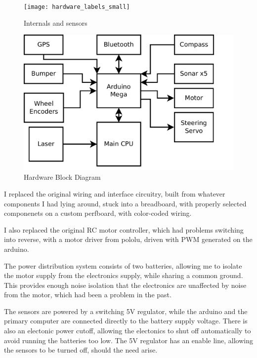 
\begin{figure}[!h]
\texttt{[image: hardware\_labels\_small]}
\caption{Internals and sensors}
\end{figure}

\begin{figure}
\includegraphics[width=1.0\textwidth]{block_diagram}
\caption{Hardware Block Diagram}
\end{figure}

I replaced the original wiring and interface circuitry, built from whatever components I had lying around, stuck into a breadboard, with properly selected componenets on a custom perfboard, with color-coded wiring.

I also replaced the original RC motor controller, which had problems switching into reverse, with a motor driver from pololu, driven with PWM generated on the arduino.

The power distribution system consists of two batteries, allowing me to isolate the motor supply from the electronics supply, while sharing a common ground. This provides enough noise isolation that the electronics are unaffected by noise from the motor, which had been a problem in the past.

The sensors are powered by a switching 5V regulator, while the arduino and the primary computer are connected directly to the battery supply voltage. There is also an electonic power cutoff, allowing the electonics to shut off automatically to avoid running the batteries too low. The 5V regulator has an enable line, allowing the sensors to be turned off, should the need arise.
